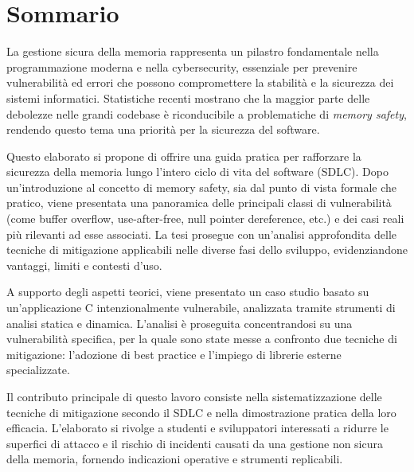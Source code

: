 \chapter*{Sommario}
\label{cha:sommario}

La gestione sicura della memoria rappresenta un pilastro fondamentale nella
programmazione moderna e nella cybersecurity, essenziale per prevenire vulnerabilità
ed errori che possono compromettere la stabilità e la sicurezza dei sistemi informatici.
Statistiche recenti mostrano che la maggior parte delle debolezze nelle grandi
codebase è riconducibile a problematiche di \textit{memory safety}, rendendo
questo tema una priorità per la sicurezza del software.

\vspace{0.5em}
\noindent
Questo elaborato si propone di offrire una guida pratica per rafforzare la
sicurezza della memoria lungo l'intero ciclo di vita del software (SDLC). Dopo un'introduzione
al concetto di memory safety, sia dal punto di vista formale che pratico, viene presentata
una panoramica delle principali classi di vulnerabilità (come buffer overflow, use-after-free,
null pointer dereference, etc.) e dei casi reali più rilevanti ad esse associati.
La tesi prosegue con un'analisi approfondita delle tecniche di mitigazione
applicabili nelle diverse fasi dello sviluppo, evidenziandone vantaggi, limiti e
contesti d'uso.

\vspace{0.5em}
\noindent
A supporto degli aspetti teorici, viene presentato un caso studio basato su un'applicazione
C intenzionalmente vulnerabile, analizzata tramite strumenti di analisi statica
e dinamica. L'analisi è proseguita concentrandosi su una vulnerabilità specifica,
per la quale sono state messe a confronto due tecniche di mitigazione: l'adozione
di best practice e l'impiego di librerie esterne specializzate.

\vspace{0.5em}
\noindent
Il contributo principale di questo lavoro consiste nella sistematizzazione delle
tecniche di mitigazione secondo il SDLC e nella dimostrazione pratica della loro
efficacia. L'elaborato si rivolge a studenti e sviluppatori interessati a
ridurre le superfici di attacco e il rischio di incidenti causati da una
gestione non sicura della memoria, fornendo indicazioni operative e strumenti replicabili.